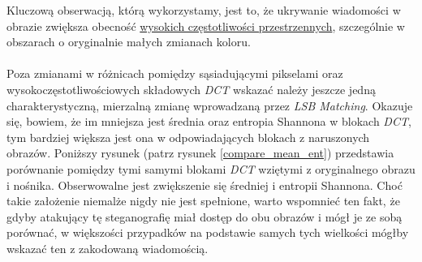         Kluczową obserwacją, którą wykorzystamy, jest to, że ukrywanie wiadomości w obrazie zwiększa obecność \underline{wysokich częstotliwości przestrzennych}, szczególnie w obszarach o oryginalnie małych zmianach koloru. \\
        \\
        Poza zmianami w różnicach pomiędzy sąsiadującymi pikselami oraz wysokoczęstotliwościowych składowych \textit{DCT} wskazać należy jeszcze jedną charakterystyczną, mierzalną zmianę wprowadzaną przez \textit{LSB Matching}. Okazuje się, bowiem, że im mniejsza jest średnia oraz entropia Shannona w blokach \textit{DCT}, tym bardziej większa jest ona w odpowiadających blokach z naruszonych obrazów. Poniższy rysunek (patrz rysunek \ref{compare_mean_ent}) przedstawia porównanie pomiędzy tymi samymi blokami \textit{DCT} wziętymi z oryginalnego obrazu i nośnika. Obserwowalne jest zwiększenie się średniej i entropii Shannona. Choć takie założenie niemalże nigdy nie jest spełnione, warto wspomnieć ten fakt, że gdyby atakujący tę steganografię miał dostęp do obu obrazów i mógł je ze sobą porównać, w większości przypadków na podstawie samych tych wielkości mógłby wskazać ten z zakodowaną wiadomością.

